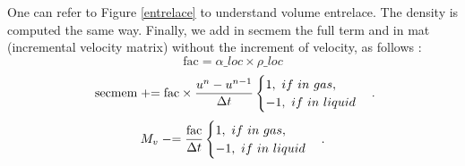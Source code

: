 One can refer to Figure \ref{entrelace} to understand volume entrelace. The density is computed the same way. Finally, we add in secmem the full term and in mat (incremental velocity matrix) without the increment of velocity, as follows :
\begin{equation}
    \text{fac} = \alpha\_loc \times \rho\_loc
\end{equation}
\begin{equation}
   \text{ secmem}  \pluseq \text{fac}\times \frac{u^n-u^{n-1}}{\Delta t}\begin{cases}1,\ if\ in\ gas,\\ -1,\ if\ in\ liquid \end{cases}.
\end{equation}
\begin{equation}
    M_v \mathrel{-}=  \frac{\text{fac}}{\Delta t}\begin{cases}1,\ if\ in\ gas,\\ -1,\ if\ in\ liquid \end{cases}.
\end{equation}

